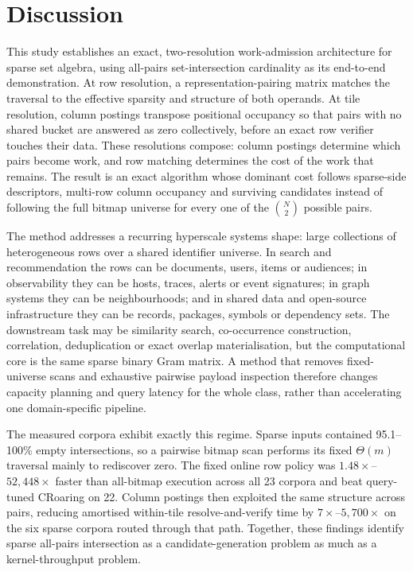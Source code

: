 \section*{Discussion}

This study establishes an exact, two-resolution work-admission architecture for sparse set algebra,
using all-pairs set-intersection cardinality as its end-to-end demonstration. At row resolution, a
representation-pairing matrix matches the traversal to the effective sparsity and structure of both
operands. At tile resolution, column
postings transpose positional occupancy so that pairs with no shared bucket are answered as zero
collectively, before an exact row verifier touches their data. These resolutions compose: column
postings determine which pairs become work, and row matching determines the cost of the work that
remains. The result is an exact algorithm whose dominant cost follows sparse-side descriptors,
multi-row column occupancy and surviving candidates instead of following the full bitmap universe
for every one of the $\binom{N}{2}$ possible pairs.

The method addresses a recurring hyperscale systems shape: large collections of heterogeneous rows
over a shared identifier universe. In search and recommendation the rows can be documents, users,
items or audiences; in observability they can be hosts, traces, alerts or event signatures; in graph
systems they can be neighbourhoods; and in shared data and open-source infrastructure they can be
records, packages, symbols or dependency sets. The downstream task may be similarity search,
co-occurrence construction, correlation, deduplication or exact overlap materialisation, but the
computational core is the same sparse binary Gram matrix. A method that removes fixed-universe scans
and exhaustive pairwise payload inspection therefore changes capacity planning and query latency for
the whole class, rather than accelerating one domain-specific pipeline.

The measured corpora exhibit exactly this regime. Sparse inputs contained 95.1--100\% empty
intersections, so a pairwise bitmap scan performs its fixed $\Theta(m)$ traversal mainly to
rediscover zero. The fixed online row policy was $1.48\times$--$52{,}448\times$ faster than
all-bitmap execution across all 23 corpora and beat query-tuned CRoaring on 22. Column postings then
exploited the same structure across pairs, reducing amortised within-tile resolve-and-verify time by
$7\times$--$5{,}700\times$ on the six sparse corpora routed through that path. Together, these
findings identify sparse all-pairs intersection as a candidate-generation problem as much as a
kernel-throughput problem.

